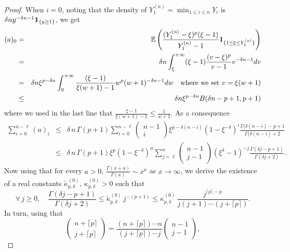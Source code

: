 \begin{proof}
When $i=0$, noting that the density of $Y^{(n)}_1= \min_{1\le i\le n}Y_i$ is
$\delta n y^{-\delta n-1}\mbox{\bf 1}_{\{y\ge 1\}}$, we get
 \begin{eqnarray*}
(a)_0&= &\mathbb{E} \left(\frac{(Y^{(n)}_1-\xi)^p(\xi-1)}{Y^{(n)}_1-1}\mbox{\bf 1}_{\{1\le \xi\le Y^{(n)}_1\}}\right) \\
&=& \delta n \int_{\xi }^{+\infty} (\xi-1)\frac{(v-\xi )^p}{v-1} v^{-\delta n-1} dv\\
&=& \delta n \xi^{p-\delta n}\int_0^{+\infty}\frac{(\xi-1)}{\xi(w+1)-1}  w^p (w+1)^{-\delta n-1} dw \quad \mbox{where we set  $v=\xi (w+1)$}  \\
&\le &   \delta n \xi^{p-\delta n} B(\delta n -p+1,p+1)
  \end{eqnarray*}
where we used in the last line that $\frac{\xi-1}{\xi(w+1)-1} \le \frac{1}{w+1}$.   As a consequence 
 \begin{eqnarray*}
\sum_{i=0}^{n-\ell} (a)_i &\le &  \delta \,n\, \Gamma(p+1) \sum_{i=0}^{n-\ell} \left(\begin{smallmatrix} n-1\\ i \end{smallmatrix}\right)\xi^{p-\delta(n-i)} (1-\xi^{-\delta})^i\frac{\Gamma(\delta(n-i)-p+1}{\Gamma(\delta(n-i)+2}\\
&\le  &\delta\, n\, \Gamma(p+1)\xi^p (1-\xi^{-\delta})^n\sum_{j=\ell}^n \left(\begin{smallmatrix} n-1\\ j -1\end{smallmatrix}\right)(\xi^{\delta}-1)^{-j} \frac{\Gamma(\delta j-p+1)}{\Gamma(\delta j +2)}.
\end{eqnarray*}
Now using that for every $a>0$, $\frac{\Gamma(x+a)}{\Gamma(x)}\sim x^a$ as $x\to \infty$, we derive the existence of a real constants $\tilde \kappa^{(0)}_{p,\delta}, \,\kappa^{(0)}_{p,\delta}>0$ such that
\[
\forall\, j\ge 0,\quad  \frac{\Gamma(\delta j-p+1)}{\Gamma(\delta j +2)} \le \tilde \kappa^{(0)}_{p,\delta}\, j^{-(p+1)}\le  \kappa^{(0)}_{p,\delta} \, \frac{j^{\lceil p\rceil -p}}{j(j+1)\cdots(j+\lceil p\rceil )}.
\]
In turn, using that
\[
\left(\begin{smallmatrix} n+\lceil p\rceil \\ j+\lceil p\rceil  \end{smallmatrix}\right) = \frac{(n+\lceil p\rceil )\cdots n}{(j+\lceil p\rceil ) \cdots j} \left(\begin{smallmatrix} n-1\\ j-1 \end{smallmatrix}\right),
\]
\end{proof}
